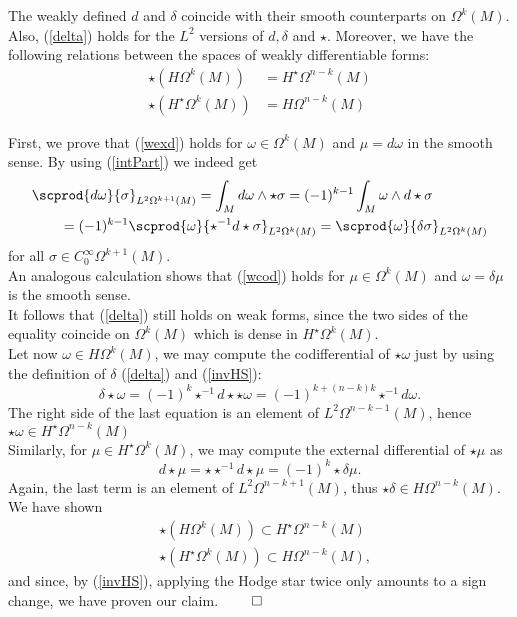\documentclass{ifacconf}
\newcommand{\drh}[2]{\Omega^{#2}(#1)}
\begin{document}
\begin{prop}
    The weakly defined $d$ and $\delta$ coincide with their smooth counterparts on $\drh{M}{k}.$\\
    Also, (\ref{delta}) holds for the $L^2$ versions of $d,\delta$ and $\star$. Moreover, we have the following relations between the spaces of weakly differentiable forms:
    \begin{align*}
        \star \left(H\drh{M}{k}\right)&=H^{\star}\drh{M}{n-k}\\
        \star \left(H^{\star}\drh{M}{k}\right)&=H\drh{M}{n-k}
    \end{align*}
\begin{pf}
First, we prove that (\ref{wexd}) holds for $\omega\in \drh{M}{k}$ and $\mu=d\omega$ in the smooth sense. By using (\ref{intPart}) we indeed get
\begin{align*}
    \MoveEqLeft
    \scprod{d\omega}{\sigma}_{L^2\drh{M}{k+1}}=\int_Md\omega\wedge\star\sigma =(-1)^{k-1}\int_M\omega\wedge d\star\sigma\\
    &= (-1)^{k-1}\scprod{\omega}{\star^{-1}d\star\sigma}_{L^2\drh{M}{k}}=\scprod{\omega}{\delta\sigma}_{L^2\drh{M}{k}}
\end{align*}
for all $\sigma\in C^{\infty}_0\drh{M}{k+1}$.\\
An analogous calculation shows that (\ref{wcod}) holds for $\mu\in\drh{M}{k}$ and $\omega=\delta\mu$ is the smooth sense.\\
It follows that (\ref{delta}) still holds on weak forms, since the two sides of the equality coincide on $\drh{M}{k}$ which is dense in $H^{\star}\drh{M}{k}$.\\
Let now $\omega\in H\drh{M}{k}$, we may compute the codifferential of $\star\omega$ just by using the definition of $\delta$ (\ref{delta}) and (\ref{invHS}):
\[
    \delta\star\omega=(-1)^k\star^{-1}d\star\star\omega=(-1)^{k+(n-k)k}\star^{-1}d\omega.
\]
The right side of the last equation is an element of $L^2\drh{M}{n-k-1}$, hence $\star\omega\in H^{\star}\drh{M}{n-k}$\\
Similarly, for $\mu\in H^{\star}\drh{M}{k}$, we may compute the external differential of $\star\mu$ as
\[
    d\star\mu=\star\star^{-1}d\star\mu=(-1)^k\star\delta\mu.
\]
Again, the last term is an element of $L^2\drh{M}{n-k+1}$, thus $\star\delta\in H\drh{M}{n-k}$.\\
We have shown 
\begin{align*}
    &\star \left(H\drh{M}{k}\right)\subset H^{\star}\drh{M}{n-k}\\
    &\star \left(H^{\star}\drh{M}{k}\right)\subset H\drh{M}{n-k},
\end{align*}
and since, by (\ref{invHS}), applying the Hodge star twice only amounts to a sign change, we have proven our claim. \hfill $\qed$
\end{pf}
\end{prop}
\end{document}
